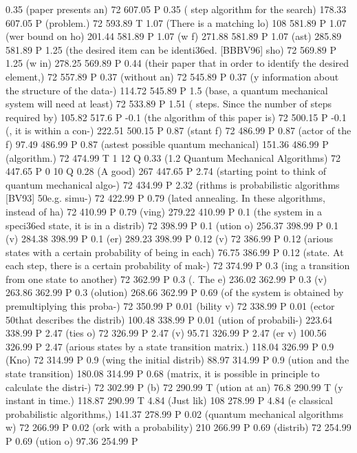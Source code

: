 0.35 (paper presents an) 72 607.05 P
0.35 ( step algorithm for the search) 178.33 607.05 P
(problem.) 72 593.89 T
1.07 (There is a matching lo) 108 581.89 P
1.07 (wer bound on ho) 201.44 581.89 P
1.07 (w f) 271.88 581.89 P
1.07 (ast) 285.89 581.89 P
1.25 (the desired item can be identi\336ed. [BBBV96] sho) 72 569.89 P
1.25 (w in) 278.25 569.89 P
0.44 (their paper that in order to identify the desired element,) 72 557.89 P
0.37 (without an) 72 545.89 P
0.37 (y information about the structure of the data-) 114.72 545.89 P
1.5 (base, a quantum mechanical system will need at least) 72 533.89 P
1.51 ( steps. Since the number of steps required by) 105.82 517.6 P
-0.1 (the algorithm of this paper is) 72 500.15 P
-0.1 (, it is within a con-) 222.51 500.15 P
0.87 (stant f) 72 486.99 P
0.87 (actor of the f) 97.49 486.99 P
0.87 (astest possible quantum mechanical) 151.36 486.99 P
(algorithm.) 72 474.99 T
1 12 Q
0.33 (1.2 Quantum Mechanical Algorithms) 72 447.65 P
0 10 Q
0.28 (A good) 267 447.65 P
2.74 (starting point to think of quantum mechanical algo-) 72 434.99 P
2.32 (rithms is probabilistic algorithms [BV93] \050e.g. simu-) 72 422.99 P
0.79 (lated annealing. In these algorithms, instead of ha) 72 410.99 P
0.79 (ving) 279.22 410.99 P
0.1 (the system in a speci\336ed state, it is in a distrib) 72 398.99 P
0.1 (ution o) 256.37 398.99 P
0.1 (v) 284.38 398.99 P
0.1 (er) 289.23 398.99 P
0.12 (v) 72 386.99 P
0.12 (arious states with a certain probability of being in each) 76.75 386.99 P
0.12 (state. At each step, there is a certain probability of mak-) 72 374.99 P
0.3 (ing a transition from one state to another) 72 362.99 P
0.3 (. The e) 236.02 362.99 P
0.3 (v) 263.86 362.99 P
0.3 (olution) 268.66 362.99 P
0.69 (of the system is obtained by premultiplying this proba-) 72 350.99 P
0.01 (bility v) 72 338.99 P
0.01 (ector \050that describes the distrib) 100.48 338.99 P
0.01 (ution of probabili-) 223.64 338.99 P
2.47 (ties o) 72 326.99 P
2.47 (v) 95.71 326.99 P
2.47 (er v) 100.56 326.99 P
2.47 (arious states by a state transition matrix.) 118.04 326.99 P
0.9 (Kno) 72 314.99 P
0.9 (wing the initial distrib) 88.97 314.99 P
0.9 (ution and the state transition) 180.08 314.99 P
0.68 (matrix, it is possible in principle to calculate the distri-) 72 302.99 P
(b) 72 290.99 T
(ution at an) 76.8 290.99 T
(y instant in time.) 118.87 290.99 T
4.84 (Just lik) 108 278.99 P
4.84 (e classical probabilistic algorithms,) 141.37 278.99 P
0.02 (quantum mechanical algorithms w) 72 266.99 P
0.02 (ork with a probability) 210 266.99 P
0.69 (distrib) 72 254.99 P
0.69 (ution o) 97.36 254.99 P
